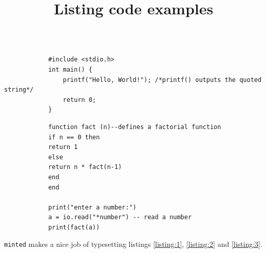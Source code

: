 \documentclass{article}
\title{Listing code examples}
\begin{document}
	\begin{listing}[!ht]
		\inputminted{octave}{BitXorMatrix.m}
		\caption{Example from external file}
		\label{listing:1}
	\end{listing}
	
	\begin{listing}[!ht]
		\begin{verbatim}
			#include <stdio.h>
			int main() {
				printf("Hello, World!"); /*printf() outputs the quoted string*/
				return 0;
			}
		\end{verbatim}
		\caption{Hello World in C}
		\label{listing:2}
	\end{listing}
	
	\begin{listing}[!ht]
		\begin{verbatim}
			function fact (n)--defines a factorial function
			if n == 0 then
			return 1
			else
			return n * fact(n-1)
			end
			end
			
			print("enter a number:")
			a = io.read("*number") -- read a number
			print(fact(a))
		\end{verbatim}
		\caption{Example from the Lua manual}
		\label{listing:3}
	\end{listing}
	\noindent\texttt{minted} makes a nice job of typesetting listings \ref{listing:1}, \ref{listing:2} and \ref{listing:3}.
	\renewcommand\listoflistingscaption{List of source codes}
	\listoflistings
\end{document}
